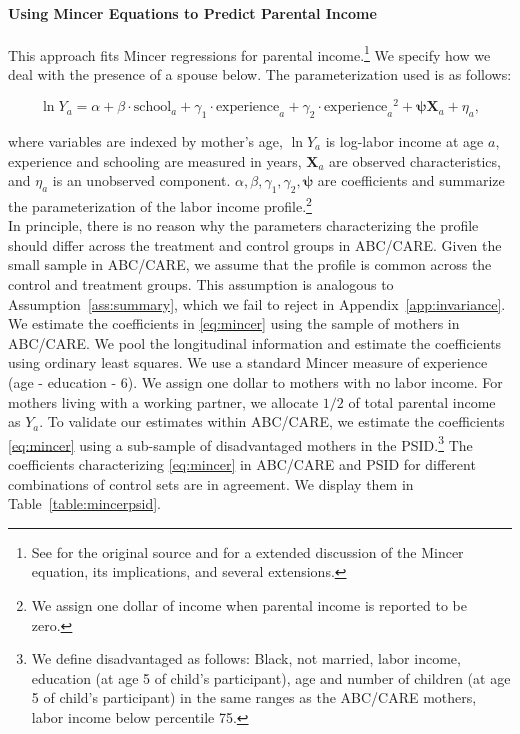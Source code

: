 \paragraph{Using Mincer Equations to Predict Parental Income} \label{appendix:mincerpar}

\noindent This approach fits Mincer regressions for parental income.\footnote{See \citet{Mincer_1974_schooling} for the original source and \citet{Heckman_Lochner_ea_2006_HEE} for a extended discussion of the Mincer equation, its implications, and several extensions.} We specify how we deal with the presence of a spouse below. The parameterization used is as follows:

\begin{equation}
\ln Y_{a} = \alpha + \beta \cdot \text{school}_{a} + \gamma_{1}  \cdot \text{experience}_{a} + \gamma_{2} \cdot {\text{experience}_{a}}^2 + \bm{\psi} \mathbf{X}_{a} + \eta_{a}, \label{eq:mincer}
\end{equation}

\noindent where variables are indexed by mother's age, $\ln Y_a$ is log-labor income at age $a$, experience and schooling are measured in years, $ \mathbf{X}_{a}$ are observed characteristics, and $\eta_{a}$ is an unobserved component. $\alpha, \beta, \gamma_{1}, \gamma_{2}, \bm{\psi}$ are coefficients and summarize the parameterization of the labor income profile.\footnote{We assign one dollar of income when parental income is reported to be zero.}\\

\noindent In principle, there is no reason why the parameters characterizing the profile should differ across the treatment and control groups in ABC/CARE. Given the small sample in ABC/CARE, we assume that the profile is common across the control and treatment groups. This assumption is analogous to Assumption~\ref{ass:summary}, which we fail to reject in Appendix~\ref{app:invariance}.\\

\noindent We estimate the coefficients in \eqref{eq:mincer} using the sample of mothers in ABC/CARE. We pool the longitudinal information and estimate the coefficients using ordinary least squares. We use a standard Mincer measure of experience (age - education - 6). We assign one dollar to mothers with no labor income. For mothers living with a working partner, we allocate $1/2$ of total parental income as $Y_{a}$. To validate our estimates within ABC/CARE, we estimate the coefficients \eqref{eq:mincer} using a sub-sample of disadvantaged mothers in the PSID.\footnote{We define disadvantaged as follows: Black, not married, labor income, education (at age 5 of child's participant), age and number of children (at age 5 of child's participant) in the same ranges as the ABC/CARE mothers, labor income below percentile 75.} The coefficients characterizing \eqref{eq:mincer} in ABC/CARE and PSID for different combinations of control sets are in agreement. We display them in Table~\ref{table:mincerpsid}.\\

